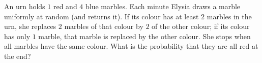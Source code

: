 An urn holds $1$ red and $4$ blue marbles. Each minute Elysia draws a marble uniformly at random (and returns it). If its colour has at least $2$ marbles in the urn, she replaces $2$ marbles of that colour by $2$ of the other colour; if its colour has only $1$ marble, that marble is replaced by the other colour. She stops when all marbles have the same colour. What is the probability that they are all red at the end?
